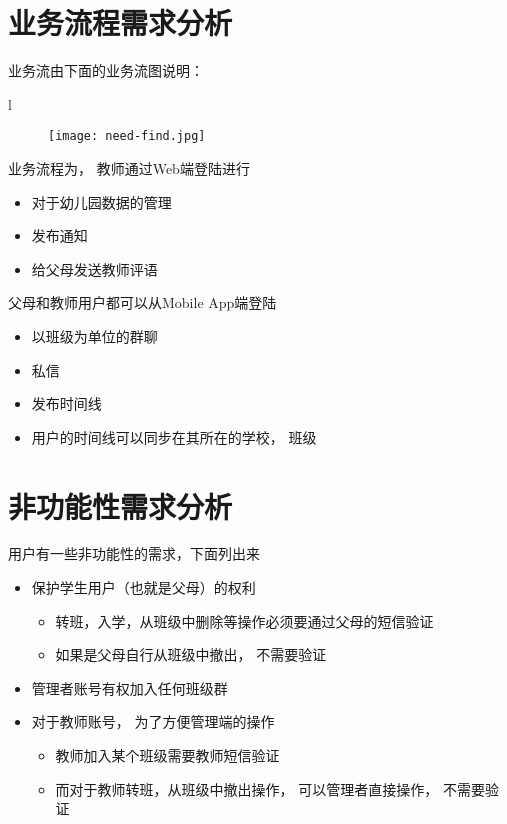 \section{业务流程需求分析}
业务流由下面的业务流图说明：

\newpage
l \newline
\begin{figure}[H]
	\centering
	\hspace*{-7cm}\texttt{[image: need-find.jpg]}
	\label{fig:need-find}
\end{figure}


业务流程为， 教师通过Web端登陆进行

\begin{itemize}
	\item 对于幼儿园数据的管理
	\item 发布通知
	\item 给父母发送教师评语
\end{itemize}

 父母和教师用户都可以从Mobile App端登陆
\begin{itemize}
	\item 以班级为单位的群聊
	\item 私信
	\item 发布时间线
	\item 用户的时间线可以同步在其所在的学校， 班级
\end{itemize}

\section{ 非功能性需求分析}

用户有一些非功能性的需求，下面列出来

\begin{itemize}
	

\item 保护学生用户（也就是父母）的权利

\begin{itemize}
	\item 转班，入学，从班级中删除等操作必须要通过父母的短信验证
	\item 如果是父母自行从班级中撤出， 不需要验证
\end{itemize}



\item 管理者账号有权加入任何班级群


\item 对于教师账号， 为了方便管理端的操作

\begin{itemize}
	\item 教师加入某个班级需要教师短信验证
	\item 而对于教师转班，从班级中撤出操作， 可以管理者直接操作， 不需要验证
\end{itemize}

\end{itemize}